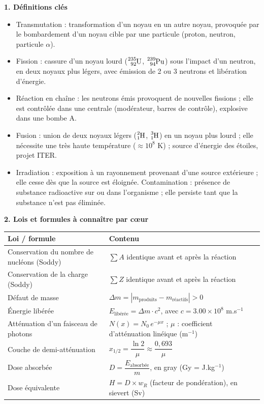 \documentclass[11pt]{article}
\newcommand{\cle}[1]{{\popxbold\color{popdark}#1}}
\begin{document}
\begin{bilan}
\textbf{1. Définitions clés}
\begin{itemize}
\item \cle{Transmutation} : transformation d'un noyau en un autre noyau, provoquée par le bombardement d'un noyau cible par une particule (proton, neutron, particule $\alpha$).
\item \cle{Fission} : cassure d'un noyau lourd ($\ce{^{235}_{92}U}$, $\ce{^{239}_{94}Pu}$) sous l'impact d'un neutron, en deux noyaux plus légers, avec émission de 2 ou 3 neutrons et libération d'énergie.
\item \cle{Réaction en chaîne} : les neutrons émis provoquent de nouvelles fissions ; elle est contrôlée dans une centrale (modérateur, barres de contrôle), explosive dans une bombe A.
\item \cle{Fusion} : union de deux noyaux légers ($\ce{^{2}_{1}H}$, $\ce{^{3}_{1}H}$) en un noyau plus lourd ; elle nécessite une très haute température ($\approx 10^{8}$ K) ; source d'énergie des étoiles, projet ITER.
\item \cle{Irradiation} : exposition à un rayonnement provenant d'une source extérieure ; elle cesse dès que la source est éloignée. \cle{Contamination} : présence de substance radioactive sur ou dans l'organisme ; elle persiste tant que la substance n'est pas éliminée.
\end{itemize}

\textbf{2. Lois et formules à connaître par cœur}
\begin{center}
\begin{tabularx}{\linewidth}{|l|X|}
\hline
\rowcolor{popblueL} \textbf{Loi / formule} & \textbf{Contenu} \\
\hline
Conservation du nombre de nucléons (Soddy) & $\sum A$ identique avant et après la réaction \\
\hline
Conservation de la charge (Soddy) & $\sum Z$ identique avant et après la réaction \\
\hline
Défaut de masse & $\Delta m = \left|m_{\text{produits}} - m_{\text{réactifs}}\right| > 0$ \\
\hline
Énergie libérée & $E_{\text{libérée}} = \Delta m \cdot c^{2}$, avec $c = \num{3,00}\times 10^{8}$ m.s$^{-1}$ \\
\hline
Atténuation d'un faisceau de photons & $N(x) = N_{0}\, e^{-\mu x}$ ; $\mu$ : coefficient d'atténuation linéique (m$^{-1}$) \\
\hline
Couche de demi-atténuation & $x_{1/2} = \dfrac{\ln 2}{\mu} \approx \dfrac{0,693}{\mu}$ \\
\hline
Dose absorbée & $D = \dfrac{E_{\text{absorbée}}}{m}$, en gray (Gy = J.kg$^{-1}$) \\
\hline
Dose équivalente & $H = D \times w_{R}$ (facteur de pondération), en sievert (Sv) \\
\hline
\end{tabularx}
\end{center}


\end{bilan}
\end{document}
